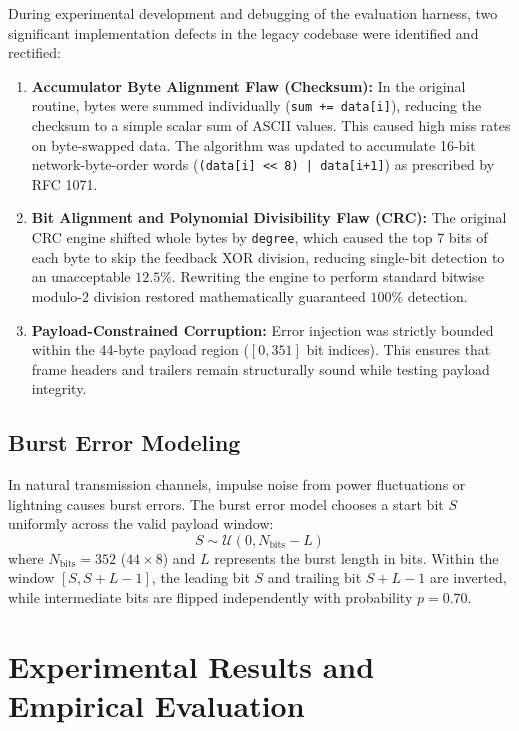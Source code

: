 \documentclass[11pt,a4paper]{article}
\begin{document}
During experimental development and debugging of the evaluation harness, two significant implementation defects in the legacy codebase were identified and rectified:
\begin{enumerate}
    \item \textbf{Accumulator Byte Alignment Flaw (Checksum):} In the original routine, bytes were summed individually (\texttt{sum += data[i]}), reducing the checksum to a simple scalar sum of ASCII values. This caused high miss rates on byte-swapped data. The algorithm was updated to accumulate 16-bit network-byte-order words (\texttt{(data[i] << 8) | data[i+1]}) as prescribed by RFC 1071.
    \item \textbf{Bit Alignment and Polynomial Divisibility Flaw (CRC):} The original CRC engine shifted whole bytes by \texttt{degree}, which caused the top 7 bits of each byte to skip the feedback XOR division, reducing single-bit detection to an unacceptable $12.5\%$. Rewriting the engine to perform standard bitwise modulo-2 division restored mathematically guaranteed $100\%$ detection.
    \item \textbf{Payload-Constrained Corruption:} Error injection was strictly bounded within the 44-byte payload region ($[0, 351]$ bit indices). This ensures that frame headers and trailers remain structurally sound while testing payload integrity.
\end{enumerate}

\subsection{Burst Error Modeling}

In natural transmission channels, impulse noise from power fluctuations or lightning causes burst errors. The burst error model chooses a start bit $S$ uniformly across the valid payload window:
\begin{equation}
    S \sim \mathcal{U}(0, N_{\text{bits}} - L)
\end{equation}
where $N_{\text{bits}} = 352$ ($44 \times 8$) and $L$ represents the burst length in bits. Within the window $[S, S + L - 1]$, the leading bit $S$ and trailing bit $S + L - 1$ are inverted, while intermediate bits are flipped independently with probability $p = 0.70$.

\section{Experimental Results and Empirical Evaluation}
\end{document}
